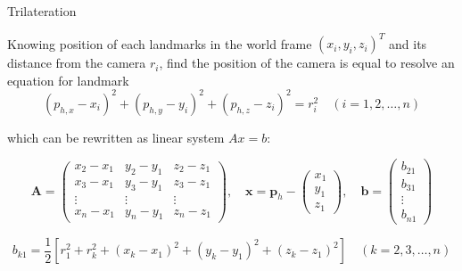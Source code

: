 \documentclass[10pt]{beamer}
\begin{document}
    \begin{frame}[fragile]{Trilateration}

        Knowing position of each landmarks in the world frame $(x_{i}, y_{i}, z_{i})^{T}$ and its distance from the camera $r_{i}$, find the position of the camera is equal to resolve an equation for landmark
        \begin{equation*}
        (p_{h,x} - x_i)^2 + (p_{h,y} - y_i)^2 + (p_{h,z} - z_i)^2 = r_i^2 \quad (i = 1, 2, \dots, n)
    \end{equation*}

        which can be rewritten as linear system $Ax= b$:

        \begin{equation*}
        \bm{A} = \begin{pmatrix}
                x_2 - x_1 & y_2 - y_1 & z_2 - z_1 \\
                x_3 - x_1 & y_3 - y_1 & z_3 - z_1 \\
                \vdots & \vdots & \vdots \\
                x_n - x_1 & y_n - y_1 & z_n - z_1
            \end{pmatrix}, \quad
        \bm{x} =
            \bm{p}_h -
            \begin{pmatrix}
                x_1 \\
                y_1 \\
                z_1
            \end{pmatrix}, \quad
        \bm{b} = \begin{pmatrix}
                b_{21} \\
                b_{31} \\
                \vdots \\
                b_{n1}
            \end{pmatrix}
    \end{equation*}

    \begin{equation*}
        b_{k1} = \frac{1}{2}\left[ r_1^2 + r_k^2 + (x_k - x_1)^2 + (y_k - y_1)^2 + (z_k - z_1)^2 \right] \quad (k = 2, 3, \dots, n)
    \end{equation*}

    \end{frame}
\end{document}
